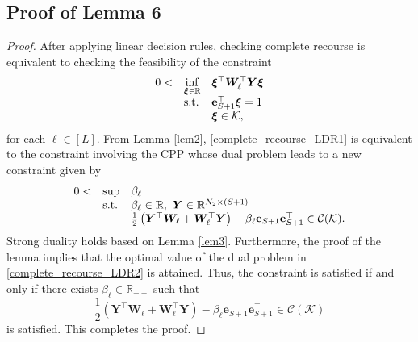 \documentclass{article}
\newcommand{\st}{\textnormal{s.t.}}
\newcommand{\RR}{\mathbb{R}}
\begin{document}
\subsection{Proof of Lemma 6}
\begin{proof}
After applying linear decision rules, checking complete recourse is equivalent to checking the feasibility of the constraint
\begin{equation}
\label{complete_recourse_LDR1}
\begin{array}{clll}
 0 < & \displaystyle \inf_{\bm \xi \in \RR} & \bm \xi^\top \bm W_\ell^\top \bm Y \bm\xi \\
 &\st & \mathbf{e}_{S+1}^\top \bm \xi = 1\\
 & & \bm\xi \in  \mathcal K, \\
 \end{array}
\end{equation}
for each $\ell \in [L]$. 
From Lemma \ref{lem2}, \eqref{complete_recourse_LDR1} is equivalent to the constraint involving the CPP whose dual problem leads to a  new constraint given by  %
\begin{equation}
\label{complete_recourse_LDR2}
\begin{array}{cll}
 0 < & \displaystyle \sup & \beta_\ell \\
 &\st & \beta_\ell \in \RR, \ \bm Y \in \RR^{N_2 \times (S+1)}\\
 & & \frac{1}{2} \left (\bm Y^\top \bm W_\ell + \bm W_\ell^\top \bm Y \right ) - \beta_\ell \mathbf{e}_{S+1} \mathbf{e}_{S+1}^\top 
  \in \mathcal{C} (\mathcal K). \\
\end{array}
\end{equation}
Strong duality holds based on Lemma \ref{lem3}. Furthermore, the proof of the lemma implies that the optimal value of the dual problem in \eqref{complete_recourse_LDR2} is attained. Thus, the constraint is satisfied if and only if there exists $\beta_\ell \in \RR_{++}$ such that 
\begin{equation}
    \frac{1}{2}\left (\bm Y^\top \bm W_\ell + \bm W_\ell^\top \bm Y \right ) - \beta_\ell \mathbf{e}_{S+1} \mathbf{e}_{S+1}^\top \in {\mathcal{C}(\mathcal{K})} 
\end{equation}
is satisfied. This completes the proof. 
\end{proof}
\end{document}
